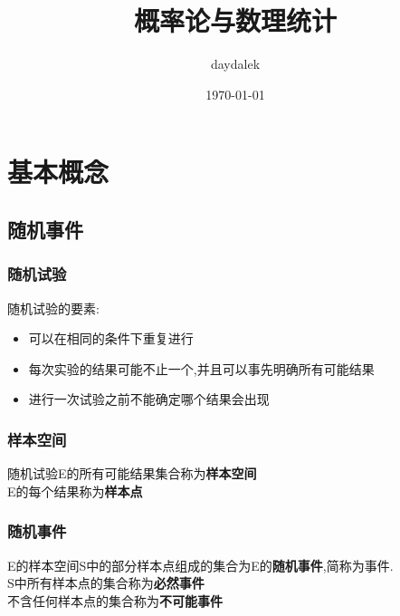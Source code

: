 \documentclass{ctexart}
\begin{document}
\title{概率论与数理统计}
\author{daydalek}
\date{\today}
\maketitle
\section{基本概念}
\subsection{随机事件}
\subsubsection{随机试验}
随机试验的要素:
\begin{itemize}
	\item 可以在相同的条件下重复进行
	\item 每次实验的结果可能不止一个,并且可以事先明确所有可能结果
	\item 进行一次试验之前不能确定哪个结果会出现
\end{itemize}
\subsubsection{样本空间}
随机试验E的所有可能结果集合称为\textbf{样本空间}\\
E的每个结果称为\textbf{样本点}\\
\subsubsection{随机事件}
E的样本空间S中的部分样本点组成的集合为E的\textbf{随机事件},简称为事件.\\
S中所有样本点的集合称为\textbf{必然事件}\\
不含任何样本点的集合称为\textbf{不可能事件}\\
\end{document}
